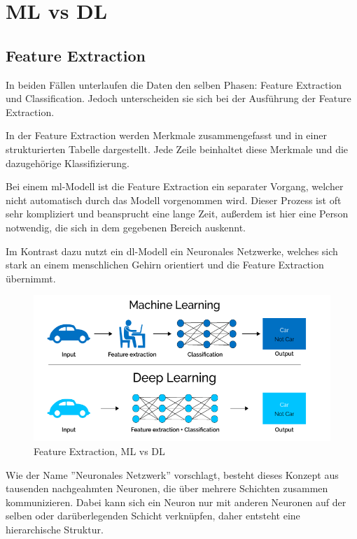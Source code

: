 \section{ML vs DL}

\subsection{Feature Extraction}

In beiden Fällen unterlaufen die Daten den selben Phasen: Feature Extraction und Classification. Jedoch unterscheiden sie sich bei der Ausführung der Feature Extraction.

In der Feature Extraction werden Merkmale zusammengefasst und in einer strukturierten Tabelle dargestellt. Jede Zeile beinhaltet diese Merkmale und die dazugehörige Klassifizierung.

Bei einem \gls{ml}-Modell ist die Feature Extraction ein separater Vorgang, welcher nicht automatisch durch das Modell vorgenommen wird. Dieser Prozess ist oft sehr kompliziert und beansprucht eine lange Zeit, außerdem ist hier eine Person notwendig, die sich in dem gegebenen Bereich auskennt.

Im Kontrast dazu nutzt ein \gls{dl}-Modell ein Neuronales Netzwerke, welches sich stark an einem menschlichen Gehirn orientiert und die Feature Extraction übernimmt.

\begin{figure}[H]
    \centering
    \includegraphics[scale=0.6]{sections/machine-learning/images/MLvsDL.png}
    \caption{Feature Extraction, ML vs DL}
\end{figure}

Wie der Name ''Neuronales Netzwerk'' vorschlagt, besteht dieses Konzept aus tausenden nachgeahmten Neuronen, die über mehrere Schichten zusammen kommunizieren. Dabei kann sich ein Neuron nur mit anderen Neuronen auf der selben oder darüberlegenden Schicht verknüpfen, daher entsteht eine hierarchische Struktur.


